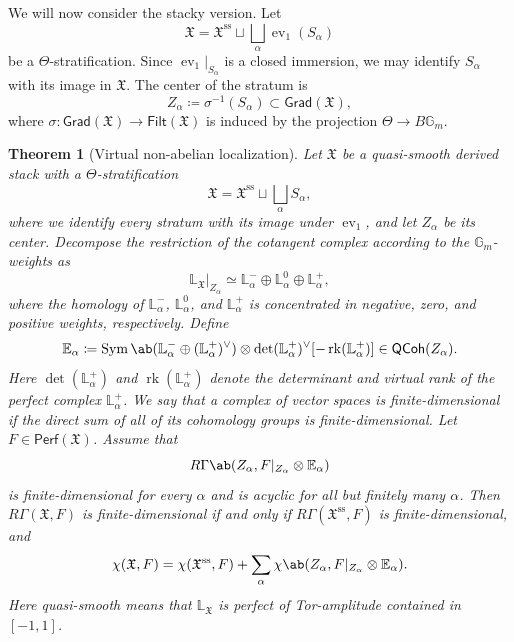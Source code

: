 \documentclass{amsart}
\newtheorem{thm}{Theorem}[section]
\theoremstyle{definition}
\theoremstyle{remark}
\theoremstyle{plain}
\theoremstyle{definition}
\theoremstyle{remark}
\newcommand{\G}{\mathbb{G}}
\newcommand{\E}{\mathbb{E}}
\renewcommand{\L}{\mathbb{L}}
\newcommand{\mf}[1]{\mathfrak{#1}}
\newcommand{\mr}[1]{\mathrm{#1}}
\newcommand{\on}[1]{\operatorname{#1}}
\newcommand{\ms}[1]{\mathsf{#1}}
\newcommand{\1}{\mathbf{1}}
\newcommand{\2}{\mathbf{2}}
\newcommand{\3}{\mathbf{3}}
\DeclareMathOperator{\ev}{ev}
\begin{document}
We will now consider the stacky version. Let
\[
    \mf{X}
    =
    \mf{X}^{\mr{ss}}
    \sqcup
    \bigsqcup_\alpha\ev_1(S_\alpha)
\]
be a \(\Theta\)-stratification. Since \(\ev_1|_{S_\alpha}\) is a closed immersion, we may identify \(S_\alpha\) with its image in \(\mf{X}\). The center of the stratum is
\[
    Z_\alpha\coloneqq\sigma^{-1}(S_\alpha)\subset\ms{Grad}(\mf{X}),
\]
where \(\sigma\colon\ms{Grad}(\mf{X})\to\ms{Filt}(\mf{X})\) is induced by the projection \(\Theta\to B\G_m\).

\begin{thm}[Virtual non-abelian localization]
    Let \(\mf{X}\) be a quasi-smooth derived stack with a \(\Theta\)-stratification
    \[
        \mf{X}
        =
        \mf{X}^{\mr{ss}}
        \sqcup
        \bigsqcup_\alpha S_\alpha,
    \]
    where we identify every stratum with its image under \(\ev_1\), and let \(Z_\alpha\) be its center. Decompose the restriction of the cotangent complex according to the \(\G_m\)-weights as
    \[
        \L_{\mf{X}}|_{Z_\alpha}
        \simeq
        \L_\alpha^-
        \oplus
        \L_\alpha^0
        \oplus
        \L_\alpha^+,
    \]
    where the homology of \(\L_\alpha^-\), \(\L_\alpha^0\), and \(\L_\alpha^+\) is concentrated in negative, zero, and positive weights, respectively. Define
    \[
        \E_\alpha
        \coloneqq
        \on{Sym}\ab(
            \L_\alpha^-
            \oplus
            (\L_\alpha^+)^\vee
        )
        \otimes
        \det(\L_\alpha^+)^\vee
        [-\on{rk}(\L_\alpha^+)]
        \in
        \ms{QCoh}(Z_\alpha).
    \]
    Here \(\det(\L_\alpha^+)\) and \(\on{rk}(\L_\alpha^+)\) denote the determinant and virtual rank of the perfect complex \(\L_\alpha^+\). We say that a complex of vector spaces is finite-dimensional if the direct sum of all of its cohomology groups is finite-dimensional.
    Let \(F\in\ms{Perf}(\mf{X})\). Assume that
    \[
        R\Gamma\ab(
            Z_\alpha,
            F|_{Z_\alpha}\otimes\E_\alpha
        )
    \]
    is finite-dimensional for every \(\alpha\) and is acyclic for all but finitely many \(\alpha\). Then \(R\Gamma(\mf{X},F)\) is finite-dimensional if and only if \(R\Gamma(\mf{X}^{\mr{ss}},F)\) is finite-dimensional, and
    \[
        \chi(\mf{X},F)
        =
        \chi(\mf{X}^{\mr{ss}},F)
        +
        \sum_\alpha
        \chi\ab(
            Z_\alpha,
            F|_{Z_\alpha}\otimes\E_\alpha
        ).
    \]
    Here quasi-smooth means that \(\L_{\mf{X}}\) is perfect of Tor-amplitude contained in \([-1,1]\).
\end{thm}
\end{document}
